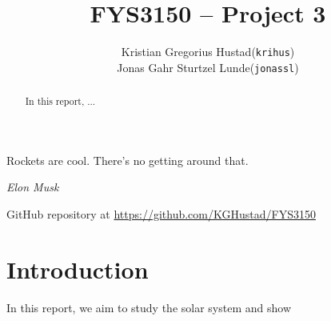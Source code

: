 \documentclass[a4paper]{article}
\begin{document}
\title{FYS3150 -- Project 3}
\author{
    \begin{tabular}{r l}
        Kristian Gregorius Hustad & (\texttt{krihus})\\
        Jonas Gahr Sturtzel Lunde & (\texttt{jonassl})
    \end{tabular}}

\maketitle



\setlength{\epigraphwidth}{0.75\textwidth}
\renewcommand{\epigraphflush}{center}
\renewcommand{\beforeepigraphskip}{50pt}
\renewcommand{\afterepigraphskip}{100pt}
\renewcommand{\epigraphsize}{\normalsize}

\epigraph{Rockets are cool. There's no getting around that.}
{\textit{Elon Musk}}


\begin{abstract}
\noindent
In this report, ...
\end{abstract}

\vfill


\begin{center}
    GitHub repository at \url{https://github.com/KGHustad/FYS3150}
\end{center}

\newpage

\newcommand{\half}{\frac{1}{2}}
\newcommand{\dt}{{\Delta t}}
\newcommand{\dx}{{\Delta x}}
\newcommand{\bigO}{{\mathcal{O}}}



\section{Introduction}\label{sec:intro}
\cite{mhj_lecture_notes} %

In this report, we aim to study the solar system and show 
\end{document}
